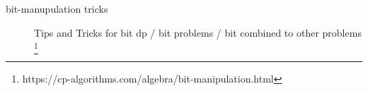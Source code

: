 {\begin{exercise}
\begin{description}
        \item[bit-manupulation tricks] Tips and Tricks for bit dp / bit problems / bit combined to other problems
        \footnote{https://cp-algorithms.com/algebra/bit-manipulation.html}
        

       
        
        
        
\end{description}
\end{exercise}}